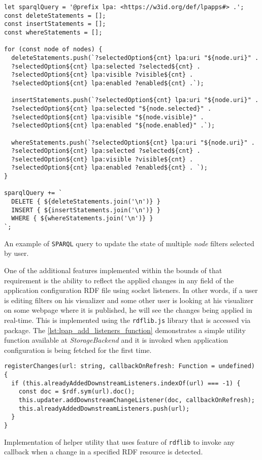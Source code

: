 \begin{listing}[H]    
\begin{verbatim}
let sparqlQuery = '@prefix lpa: <https://w3id.org/def/lpapps#> .';
const deleteStatements = [];
const insertStatements = [];
const whereStatements = [];

for (const node of nodes) {
  deleteStatements.push(`?selectedOption${cnt} lpa:uri "${node.uri}" .
  ?selectedOption${cnt} lpa:selected ?selected${cnt} .
  ?selectedOption${cnt} lpa:visible ?visible${cnt} .
  ?selectedOption${cnt} lpa:enabled ?enabled${cnt} .`);

  insertStatements.push(`?selectedOption${cnt} lpa:uri "${node.uri}" .
  ?selectedOption${cnt} lpa:selected "${node.selected}" .
  ?selectedOption${cnt} lpa:visible "${node.visible}" .
  ?selectedOption${cnt} lpa:enabled "${node.enabled}" .`);

  whereStatements.push(`?selectedOption${cnt} lpa:uri "${node.uri}" .
  ?selectedOption${cnt} lpa:selected ?selected${cnt} .
  ?selectedOption${cnt} lpa:visible ?visible${cnt} .
  ?selectedOption${cnt} lpa:enabled ?enabled${cnt} . `);
}

sparqlQuery += `
  DELETE { ${deleteStatements.join('\n')} }
  INSERT { ${insertStatements.join('\n')} }
  WHERE { ${whereStatements.join('\n')} }
`;
\end{verbatim}
\caption{An example of \texttt{SPARQL} query to update the state of multiple \textit{node} filters selected by user.} 
\label{lst:lpapp_sample_set_filter_sparql}
\end{listing}

One of the additional features implemented within the bounds of that requirement is the ability to reflect the applied changes in any field of the application configuration RDF file using socket listeners. In other words, if a user is editing filters on his visualizer and some other user is looking at his visualizer on some webpage where it is published, he will see the changes being applied in real-time. This is implemented using the \texttt{rdflib.js} library that is accessed via \lpas{} package. The \autoref{lst:lpap_add_listeners_function} demonstrates a simple utility function available at \textit{StorageBackend} and it is invoked when application configuration is being fetched for the first time. 


\begin{listing}[H]    
\begin{verbatim}
registerChanges(url: string, callbackOnRefresh: Function = undefined) {
  if (this.alreadyAddedDownstreamListeners.indexOf(url) === -1) {
    const doc = $rdf.sym(url).doc();
    this.updater.addDownstreamChangeListener(doc, callbackOnRefresh);
    this.alreadyAddedDownstreamListeners.push(url);
  }
}
\end{verbatim}
\caption{Implementation of helper utility that uses feature of \texttt{rdflib} to invoke any callback when a change in a specified RDF resource is detected.} 
\label{lst:lpap_add_listeners_function}
\end{listing}

